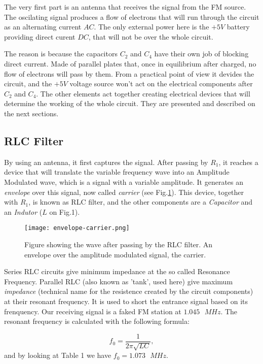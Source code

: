 \documentclass{article}
\begin{document}
The very first part is an antenna that receives the signal from the FM source.
The oscilating signal produces a flow of electrons that will run through the circuit 
as an alternating current $AC$. The only external power here is the $+5V$ battery providing 
direct curent $DC$, that will not be over the whole circuit. 

The reason is because the capacitors $C_{2}$ and $C_{4}$ have their own job of blocking direct
current. Made of parallel plates that, once in equilibrium after
charged, no flow of electrons will pass by them. 
From a practical point of view it devides the circuit, and the
$+5V$ voltage source won't act on the electrical components after
$C_{2}$ and $C_{4}$. The other elements act together creating electrical
devices that will determine the working of the whole circuit. They are
presented and described on the next sections.

\subsection{RLC Filter}

By using an antenna, it first captures the signal. After passing by
$R_{1}$, it reaches a device that will translate the variable frequency
wave into an Amplitude Modulated wave, which is a signal with a variable
amplitude. It generates an \emph{envelope} over this signal, now called \emph{carrier} (see Fig.\ref{carrier-envelope}). This device, together with $R_{1}$, is known as RLC filter, and the other components are a \emph{Capacitor} and an \emph{Indutor} ($L$ on Fig.1). 

\begin{figure}[H]
\center
\texttt{[image: envelope-carrier.png]}
\caption {Figure showing the wave after passing by the RLC filter. An envelope over the amplitude modulated signal, the carrier.} 
\label{carrier-envelope}
\end{figure}

Series RLC circuits give minimum impedance at the so called Resonance Frequency. Parallel RLC (also known as 'tank', used here) give maximum \emph{impedance} (technical name for the resistence
created by the circuit components) at their resonant frequency. It is used to short the entrance signal based on its frenquency. Our receiving signal is a faked FM station at $1.045 \text{ }MHz$. The resonant frequency is calculated with the following formula:

\begin{equation}
f_{0}=\frac{1}{2 \pi \sqrt{LC}},
\label{eq:1}
\end{equation}
and by looking at Table 1 we have $f_{0}=1.073 \text{ }MHz$. 
\end{document}
